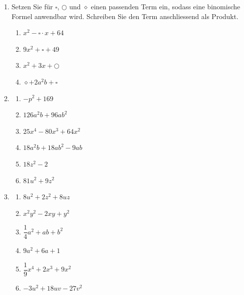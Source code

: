 \begin{ueb}
\begin{enumerate}[resume]
        \item Setzen Sie für \(\square\), \(\bigcirc\) und \(\diamond\) einen passenden Term ein, sodass eine binomische Formel anwendbar wird. Schreiben Sie den Term anschliessend als Produkt.

              \begin{enumerate}
                  \item \(x^2-\square\cdot x+64\)
                  \item \(9x^2+\square+49\)
                  \item \(x^2+3x+\bigcirc\)
                  \item \(\diamond+2a^2b+\square\)
              \end{enumerate}

        \item
              \begin{enumerate}
                  \item \(-p^2+169\)
                  \item \(126a^2b+96ab^2\)
                  \item \(25x^4-80x^3+64x^2\)
                  \item \(18a^2b+18ab^2-9ab\)
                  \item \(18z^2-2\)
                  \item \(81u^2+9z^2\)
              \end{enumerate}

        \item
              \begin{enumerate}
                  \item \(8u^2+2z^2+8uz\)
                  \item \(x^2y^2-2xy+y^2\)
                  \item \(\dfrac{1}{4}a^2+ab+b^2\)
                  \item \(9a^2+6a+1\)
                  \item \(\dfrac{1}{9}x^4+2x^3+9x^2\)
                  \item \(-3u^2+18uv-27v^2\)
              \end{enumerate}


\end{enumerate}
\end{ueb}
